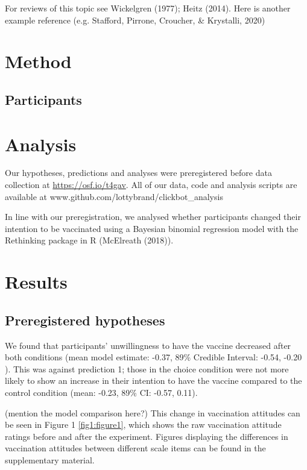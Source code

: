 \documentclass[
  english,
  ,jou,floatsintext]{apa6}
\begin{document}
For reviews of this topic see Wickelgren (1977); Heitz (2014). Here is another example reference (e.g. Stafford, Pirrone, Croucher, \& Krystalli, 2020)

\hypertarget{method}{%
\section{Method}\label{method}}

\hypertarget{participants}{%
\subsection{Participants}\label{participants}}

\hypertarget{analysis}{%
\section{Analysis}\label{analysis}}

Our hypotheses, predictions and analyses were preregistered before data collection at \url{https://osf.io/t4gav}. All of our data, code and analysis scripts are available at www.github.com/lottybrand/clickbot\_analysis

In line with our preregistration, we analysed whether participants changed their intention to be vaccinated using a Bayesian binomial regression model with the Rethinking package in R (McElreath (2018)).

\hypertarget{results}{%
\section{Results}\label{results}}

\hypertarget{preregistered-hypotheses}{%
\subsection{Preregistered hypotheses}\label{preregistered-hypotheses}}

We found that participants' unwillingness to have the vaccine decreased after both conditions (mean model estimate: -0.37, 89\% Credible Interval: -0.54, -0.20 ). This was against prediction 1; those in the choice condition were not more likely to show an increase in their intention to have the vaccine compared to the control condition (mean: -0.23, 89\% CI: -0.57, 0.11).

(mention the model comparison here?) This change in vaccination attitudes can be seen in Figure 1 \ref{fig1:figure1}, which shows the raw vaccination attitude ratings before and after the experiment. Figures displaying the differences in vaccination attitudes between different scale items can be found in the supplementary material.
\end{document}
